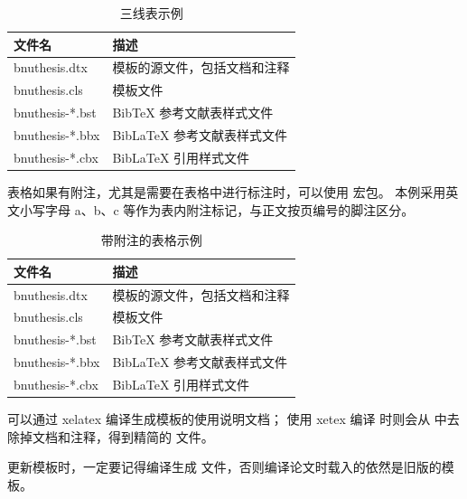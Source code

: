 \begin{table}[htbp]
  \centering
  \caption{三线表示例}
  \begin{tabular}{ll}
    \toprule
    文件名          & 描述                         \\
    \midrule
    bnuthesis.dtx   & 模板的源文件，包括文档和注释 \\
    bnuthesis.cls   & 模板文件                     \\
    bnuthesis-*.bst & BibTeX 参考文献表样式文件    \\
    bnuthesis-*.bbx & BibLaTeX 参考文献表样式文件  \\
    bnuthesis-*.cbx & BibLaTeX 引用样式文件        \\
    \bottomrule
  \end{tabular}
  \label{tab:three-line}
\end{table}

表格如果有附注，尤其是需要在表格中进行标注时，可以使用  宏包。
本例采用英文小写字母 a、b、c 等作为表内附注标记，与正文按页编号的脚注区分。

\begin{table}[htbp]
  \centering
  \begin{threeparttable}[c]
    \caption{带附注的表格示例}
    \label{tab:three-part-table}
    \begin{tabular}{ll}
      \toprule
      文件名                 & 描述                         \\
      \midrule
      bnuthesis.dtx\tnote{a} & 模板的源文件，包括文档和注释 \\
      bnuthesis.cls\tnote{b} & 模板文件                     \\
      bnuthesis-*.bst        & BibTeX 参考文献表样式文件    \\
      bnuthesis-*.bbx        & BibLaTeX 参考文献表样式文件  \\
      bnuthesis-*.cbx        & BibLaTeX 引用样式文件        \\
      \bottomrule
    \end{tabular}
    \begin{tablenotes}
      \item [a] 可以通过 xelatex 编译生成模板的使用说明文档；
        使用 xetex 编译  时则会从  中去除掉文档和注释，得到精简的  文件。
      \item [b] 更新模板时，一定要记得编译生成  文件，否则编译论文时载入的依然是旧版的模板。
    \end{tablenotes}
  \end{threeparttable}
\end{table}

